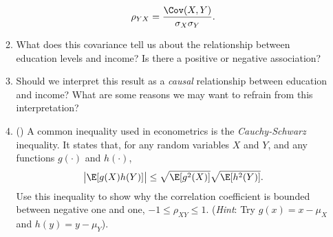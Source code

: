 \documentclass[10pt]{article}
\begin{document}
\begin{enumerate}
\begin{enumerate}
		 \[
			 \rho_{YX} = \frac{\Cov(X,Y)}{\sigma_X\sigma_Y} 
		.\] 
		\item What does this covariance tell us about the relationship between education levels and income? Is there a positive or negative association?
		\item Should we interpret this result as a \emph{causal} relationship between education and income? What are some reasons we may want to refrain from this interpretation?
		\item () A common inequality used in econometrics is the \emph{Cauchy-Schwarz} inequality. It states that, for any random variables \(X\) and  \(Y\), and any functions  \(g(\cdot)\) and  \(h(\cdot)\), 
		 \[
			 \left|\E[g(X)h(Y)]\right| \leq \sqrt{\E[g^2(X)]}\sqrt{\E[h^2(Y)]}
		.\] 
		Use this inequality to show why the correlation coefficient is bounded between negative one and one, \(-1 \leq \rho_{XY} \leq 1\). (\emph{Hint}: Try \(g(x) = x - \mu_X\) and \(h(y) = y - \mu_Y\)).
	\end{enumerate}
\end{enumerate}
\end{document}
